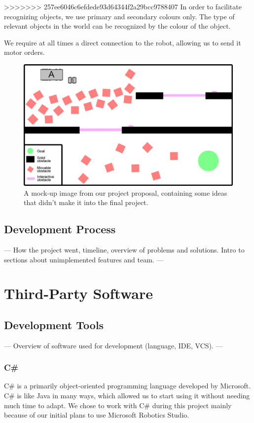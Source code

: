 \documentclass[10pt, abstracton]{scrartcl}
\begin{document}
>>>>>>> 257ee6046c6efdede93d64344f2a29bcc9788407
In order to facilitate recognizing objects, we use primary and secondary colours only. The type of relevant objects in the world can be recognized by the colour of the object.

We require at all times a direct connection to the robot, allowing us to send it motor orders.

\begin{figure}
	\centering
	\includegraphics[width=\columnwidth]{pictures/proposalImage.png}
	\caption{\small A mock-up image from our project proposal, containing some ideas that didn't make it into the final project.}
	\label{fig:proposal}
\end{figure}

\subsection{Development Process}
---
How the project went, timeline, overview of problems and solutions. Intro to sections about unimplemented features and team.
---

\section{Third-Party Software}

\subsection{Development Tools}
---
Overview of software used for development (language, IDE, VCS).
---

\subsubsection{C\#}
C\# is a primarily object-oriented programming language developed by Microsoft. C\# is like Java in many ways, which allowed us to start using it without needing much time to adapt. We chose to work with C\# during this project mainly because of our initial plans to use Microsoft Robotics Studio.
\end{document}
